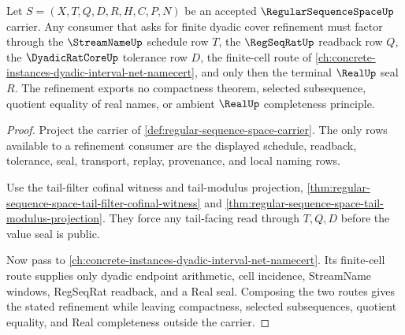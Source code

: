 \begin{theorem}
\label{thm:regular-sequence-space-dyadic-interval-net-refinement}
Let $S=(X,T,Q,D,R,H,C,P,N)$ be an accepted $\RegularSequenceSpaceUp$ carrier. Any consumer that asks for finite dyadic cover refinement must factor through the $\StreamNameUp$ schedule row $T$, the $\RegSeqRatUp$ readback row $Q$, the $\DyadicRatCoreUp$ tolerance row $D$, the finite-cell route of \autoref{ch:concrete-instances-dyadic-interval-net-namecert}, and only then the terminal $\RealUp$ seal $R$. The refinement exports no compactness theorem, selected subsequence, quotient equality of real names, or ambient $\RealUp$ completeness principle.
\end{theorem}
\begin{proof}
Project the carrier of \autoref{def:regular-sequence-space-carrier}. The only rows available to a refinement consumer are the displayed schedule, readback, tolerance, seal, transport, replay, provenance, and local naming rows.

Use the tail-filter cofinal witness and tail-modulus projection, \autoref{thm:regular-sequence-space-tail-filter-cofinal-witness} and \autoref{thm:regular-sequence-space-tail-modulus-projection}. They force any tail-facing read through $T,Q,D$ before the value seal is public.

Now pass to \autoref{ch:concrete-instances-dyadic-interval-net-namecert}. Its finite-cell route supplies only dyadic endpoint arithmetic, cell incidence, StreamName windows, RegSeqRat readback, and a Real seal. Composing the two routes gives the stated refinement while leaving compactness, selected subsequences, quotient equality, and Real completeness outside the carrier.
\end{proof}

